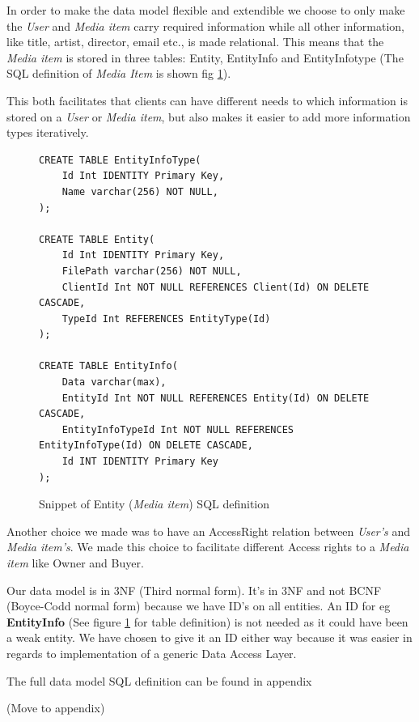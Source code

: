 \documentclass[../report.tex]{subfiles}
\begin{document}
In order to make the data model flexible and extendible we choose to only make the \textit{User} and \textit{Media item} carry required information while all other information, like title, artist, director, email etc., is made relational. This means that the \textit{Media item} is stored in three tables: Entity, EntityInfo and EntityInfotype (The SQL definition of \textit{Media Item} is shown fig \ref{datamodel}).

This both facilitates that clients can have different needs to which information is stored on a \textit{User} or \textit{Media item}, but also makes it easier to add more information types iteratively.\\

\begin{figure}[H]
\begin{lstlisting}
CREATE TABLE EntityInfoType(
	Id Int IDENTITY Primary Key,
	Name varchar(256) NOT NULL,
);

CREATE TABLE Entity(
	Id Int IDENTITY Primary Key,
	FilePath varchar(256) NOT NULL,
	ClientId Int NOT NULL REFERENCES Client(Id) ON DELETE CASCADE,
	TypeId Int REFERENCES EntityType(Id)
);

CREATE TABLE EntityInfo(
	Data varchar(max),
	EntityId Int NOT NULL REFERENCES Entity(Id) ON DELETE CASCADE,
	EntityInfoTypeId Int NOT NULL REFERENCES EntityInfoType(Id) ON DELETE CASCADE,
	Id INT IDENTITY Primary Key
);
\end{lstlisting}
\caption{Snippet of Entity (\textit{Media item}) SQL definition}
\label{datamodel}
\end{figure}

Another choice we made was to have an AccessRight relation between \textit{User's} and \textit{Media item's}. We made this choice to facilitate different Access rights to a \textit{Media item} like Owner and Buyer.

Our data model is in 3NF (Third normal form). It's in 3NF and not BCNF (Boyce-Codd normal form) because we have ID's on all entities. An ID for eg \textbf{EntityInfo} (See figure \ref{datamodel} for table definition) is not needed as it could have been a weak entity. We have chosen to give it an ID either way because it was easier in regards to implementation of a generic Data Access Layer.

The full data model SQL definition can be found in appendix

(Move to appendix)
\end{document}
